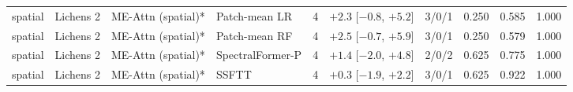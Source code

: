 \begin{tabular}{llllcclccc}
spatial & Lichens 2 & ME-Attn (spatial)* & Patch-mean LR & 4 & $+2.3$ [$-0.8$, $+5.2$] & 3/0/1 & 0.250 & 0.585 & 1.000 \\
spatial & Lichens 2 & ME-Attn (spatial)* & Patch-mean RF & 4 & $+2.5$ [$-0.7$, $+5.9$] & 3/0/1 & 0.250 & 0.579 & 1.000 \\
spatial & Lichens 2 & ME-Attn (spatial)* & SpectralFormer-P & 4 & $+1.4$ [$-2.0$, $+4.8$] & 2/0/2 & 0.625 & 0.775 & 1.000 \\
spatial & Lichens 2 & ME-Attn (spatial)* & SSFTT & 4 & $+0.3$ [$-1.9$, $+2.2$] & 3/0/1 & 0.625 & 0.922 & 1.000 \\
\bottomrule
\end{tabular}
